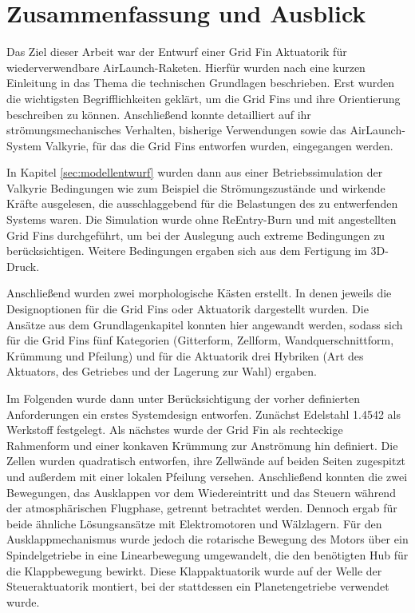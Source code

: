 \chapter{Zusammenfassung und Ausblick}
Das Ziel dieser Arbeit war der Entwurf einer Grid Fin Aktuatorik für wiederverwendbare AirLaunch-Raketen. Hierfür wurden nach eine kurzen Einleitung in das Thema die technischen Grundlagen beschrieben. Erst wurden die wichtigsten Begrifflichkeiten geklärt, um die Grid Fins und ihre Orientierung beschreiben zu können. Anschließend konnte detailliert auf ihr strömungsmechanisches Verhalten, bisherige Verwendungen sowie das AirLaunch-System Valkyrie, für das die Grid Fins entworfen wurden, eingegangen werden.

In Kapitel \ref{sec:modellentwurf} wurden dann aus einer Betriebssimulation der Valkyrie Bedingungen wie zum Beispiel die Strömungszustände und wirkende Kräfte ausgelesen, die ausschlaggebend für die Belastungen des zu entwerfenden Systems waren. Die Simulation wurde ohne ReEntry-Burn und mit angestellten Grid Fins durchgeführt, um bei der Auslegung auch extreme Bedingungen zu berücksichtigen. Weitere Bedingungen ergaben sich aus dem Fertigung im 3D-Druck.

Anschließend wurden zwei morphologische Kästen erstellt. In denen jeweils die Designoptionen für die Grid Fins oder Aktuatorik dargestellt wurden. Die Ansätze aus dem Grundlagenkapitel konnten hier angewandt werden, sodass sich für die Grid Fins fünf Kategorien (Gitterform, Zellform, Wandquerschnittform, Krümmung und Pfeilung) und für die Aktuatorik drei Hybriken (Art des Aktuators, des Getriebes und der Lagerung zur Wahl) ergaben.

Im Folgenden wurde dann unter Berücksichtigung der vorher definierten Anforderungen ein erstes Systemdesign entworfen. Zunächst Edelstahl 1.4542 als Werkstoff festgelegt. Als nächstes wurde der Grid Fin als rechteckige Rahmenform und einer konkaven Krümmung zur Anströmung hin definiert. Die Zellen wurden quadratisch entworfen, ihre Zellwände auf beiden Seiten zugespitzt und außerdem mit einer lokalen Pfeilung versehen. Anschließend konnten die zwei Bewegungen, das Ausklappen vor dem Wiedereintritt und das Steuern während der atmosphärischen Flugphase, getrennt betrachtet werden. Dennoch ergab für beide ähnliche Lösungsansätze mit Elektromotoren und Wälzlagern. Für den Ausklappmechanismus wurde jedoch die rotarische Bewegung des Motors über ein Spindelgetriebe in eine Linearbewegung  umgewandelt, die den benötigten Hub für die Klappbewegung bewirkt. Diese Klappaktuatorik wurde auf der Welle der Steueraktuatorik montiert, bei der stattdessen ein Planetengetriebe verwendet wurde. 

